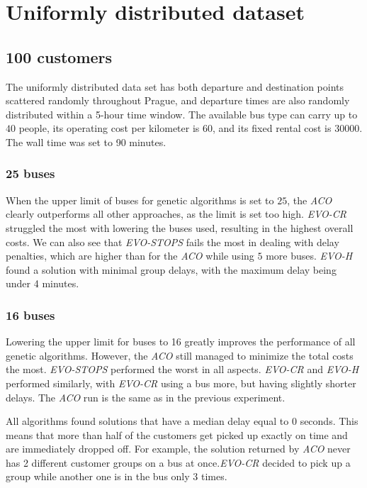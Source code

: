 \clearpage

\section{Uniformly distributed dataset}

\subsection{100 customers}

The uniformly distributed data set has both departure and destination points scattered randomly throughout Prague, and departure times are also randomly distributed within a 5-hour time window. The available bus type can carry up to $40$ people, its operating cost per kilometer is $60$, and its fixed rental cost is $30000$. The wall time was set to 90 minutes.

\subsubsection{25 buses}

When the upper limit of buses for genetic algorithms is set to $25$, the \textit{ACO} clearly outperforms all other approaches, as the limit is set too high. \textit{EVO-CR} struggled the most with lowering the buses used, resulting in the highest overall costs. We can also see that \textit{EVO-STOPS} fails the most in dealing with delay penalties, which are higher than for the \textit{ACO} while using $5$ more buses. \textit{EVO-H} found a solution with minimal group delays, with the maximum delay being under 4 minutes.

\subsubsection{16 buses}

Lowering the upper limit for buses to 16 greatly improves the performance of all genetic algorithms. However, the \textit{ACO} still managed to minimize the total costs the most. \textit{EVO-STOPS} performed the worst in all aspects. \textit{EVO-CR} and \textit{EVO-H} performed similarly, with \textit{EVO-CR} using a bus more, but having slightly shorter delays. The \textit{ACO} run is the same as in the previous experiment.

All algorithms found solutions that have a median delay equal to $0$ seconds. This means that more than half of the customers get picked up exactly on time and are immediately dropped off. For example, the solution returned by \textit{ACO} never has 2 different customer groups on a bus at once.\textit{EVO-CR} decided to pick up a group while another one is in the bus only 3 times.

